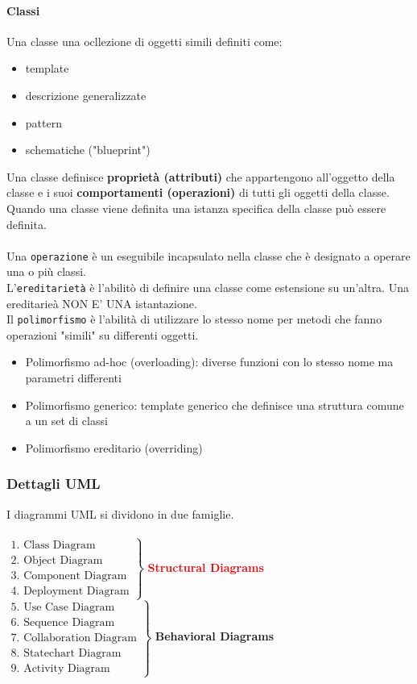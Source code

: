 \documentclass[a4paper,12pt]{article}
\begin{document}
\paragraph{Classi} Una classe  una ocllezione di oggetti simili definiti come:
\begin{itemize}
  \item template
  \item descrizione generalizzate
  \item pattern
  \item schematiche ("blueprint")
\end{itemize}
Una classe definisce \textbf{proprietà (attributi)} che appartengono all'oggetto della classe e i suoi \textbf{comportamenti (operazioni)} di tutti gli oggetti della classe. Quando una classe viene definita una istanza specifica della classe può essere definita.\\
\vspace{1px}\\
Una \texttt{operazione} è un eseguibile incapsulato nella classe che è designato a operare una o più classi.\\
L'\texttt{ereditarietà} è l'abilitò di definire una classe come estensione su un'altra. Una ereditarieà NON E' UNA istantazione.\\
Il \texttt{polimorfismo} è l'abilità di utilizzare lo stesso nome per metodi che fanno operazioni "simili" su differenti oggetti.
\begin{itemize}
  \item Polimorfismo ad-hoc (overloading): diverse funzioni con lo stesso nome ma parametri differenti
  \item Polimorfismo generico: template generico che definisce una struttura comune a un set di classi
  \item Polimorfismo ereditario (overriding)
\end{itemize}
\subsubsection{Dettagli UML}
I diagrammi UML si dividono in due famiglie.\\
\vspace{1px}\\
$\left.\begin{array}{l}
  \text{1. Class Diagram}\\
  \text{2. Object Diagram}\\
  \text{3. Component Diagram}\\
  \text{4. Deployment Diagram}
\end{array}\right\}$ \textbf{\textcolor{red}{Structural Diagrams}}\\[1em]
$\left.\begin{array}{l}
  \text{5. Use Case Diagram}\\
  \text{6. Sequence Diagram}\\
  \text{7. Collaboration Diagram}\\
  \text{8. Statechart Diagram}\\
  \text{9. Activity Diagram}
\end{array}\right\}$ \textbf{\textcolor{green!50!black}{Behavioral Diagrams}}
\end{document}
